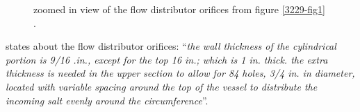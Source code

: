 \documentclass[ms,a4paper]{memoir}
\newcommand*{\mrsarchive}{../../msr-archive}%
\begin{document}
\begin{figure}[H]
  \centering
  \caption{zoomed in view of the flow distributor orifices from figure \ref{3229-fig1} \parencite[figure 1]{ornl-tm-3229}.}
  \label{3229-fig1-zoom}
\end{figure}

\parencite[page 108]{ornl-tm-0728} states about the flow distributor orifices:
\enquote{\textit{the wall thickness of the cylindrical portion is 9/16 .in., except for the top 16 in.; which is 1 in. thick. the extra thickness is needed in the upper section to allow for 84 holes, 3/4 in. in diameter, located with variable spacing around the top of the vessel to distribute the incoming salt evenly around the circumference}}. \\
\end{document}
